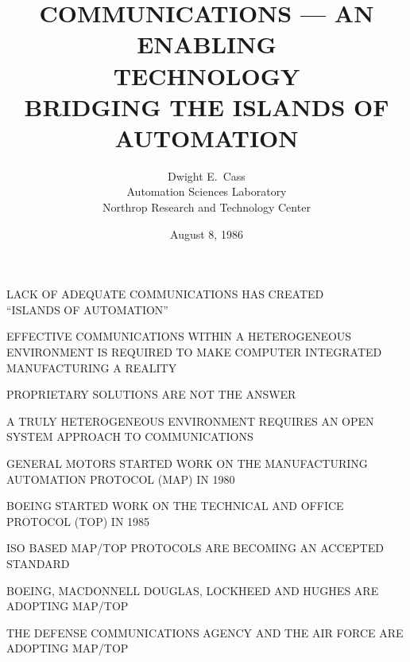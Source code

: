 

\raggedright



\title	{COMMUNICATIONS --- AN ENABLING\\
	 TECHNOLOGY\\
	 BRIDGING THE ISLANDS OF AUTOMATION}
\author	{Dwight E.~Cass\\
	Automation Sciences Laboratory\\
	Northrop Research and Technology Center}
\date	{August 8, 1986}
\maketitlepage

\begin {bwslide}

\begin	{nrtc}
\item	LACK OF ADEQUATE COMMUNICATIONS HAS CREATED\\
	``ISLANDS OF AUTOMATION''
\item	EFFECTIVE COMMUNICATIONS WITHIN A HETEROGENEOUS
	ENVIRONMENT IS REQUIRED TO MAKE COMPUTER INTEGRATED
	MANUFACTURING A REALITY
\item 	PROPRIETARY SOLUTIONS ARE NOT THE ANSWER
	\begin	{nrtc}
	\item	A TRULY HETEROGENEOUS ENVIRONMENT REQUIRES AN OPEN SYSTEM
	      	APPROACH TO COMMUNICATIONS
	\end	{nrtc}
\end	{nrtc}
\end	{bwslide}
 
\begin {bwslide}

\begin	{nrtc}
\item 	GENERAL MOTORS STARTED WORK ON THE MANUFACTURING
	AUTOMATION PROTOCOL (MAP) IN 1980	
\item	BOEING STARTED WORK ON THE
	TECHNICAL AND OFFICE PROTOCOL (TOP) IN 1985
\item	ISO BASED MAP/TOP PROTOCOLS ARE BECOMING AN ACCEPTED STANDARD
	\begin	{nrtc}
	\item	BOEING, MACDONNELL DOUGLAS, LOCKHEED AND HUGHES ARE
		ADOPTING MAP/TOP
	\item	THE DEFENSE COMMUNICATIONS AGENCY AND
		THE AIR FORCE ARE ADOPTING MAP/TOP
	\end	{nrtc}
\end	{nrtc}
\end	{bwslide}

